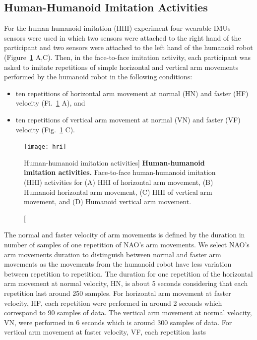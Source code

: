 \subsection{Human-Humanoid Imitation Activities} \label{sec:experiment:hhi}
For the human-humanoid imitation (HHI) experiment four wearable IMUs sensors 
were used in which two sensors were attached to the right hand of 
the participant and two sensors were attached to the left hand of 
the humanoid robot (Figure~\ref{fig:hri} A,C).
Then, in the face-to-face imitation activity, each participant was asked 
to imitate repetitions of simple horizontal and vertical arm movements 
performed by the humanoid robot in the following conditions:
\begin{itemize}[noitemsep,topsep=0pt]
\item ten repetitions of horizontal arm movement at normal (HN) and faster (HF) 
velocity (Fi.~\ref{fig:hri} A), and
\item ten repetitions of vertical arm movement at normal (VN) and faster (VF) 
velocity (Fig.~\ref{fig:hri} C).
\end{itemize}
\begin{figure}
  \centering
  \texttt{[image: hri]}
    \caption
	[Human-humanoid imitation activities]{
	{\bf Human-humanoid imitation activities.} 
		Face-to-face human-humanoid imitation (HHI) activities for 
		(A) HHI of horizontal arm movement, 
		(B) Humanoid horizontal arm movement,
		(C) HHI of vertical arm movement, and 
		(D) Humanoid vertical arm movement.
        }
    \label{fig:hri}
\end{figure}
The normal and faster velocity of arm movements is defined by the duration in 
number of samples of one repetition of NAO's arm movements.
We select NAO's arm movements duration to distinguish between normal and 
faster arm movements as the movements from the humanoid robot have less 
variation between repetition to repetition. 
The duration for one repetition of the horizontal 
arm movement at normal velocity, HN, is about 5 seconds considering that 
each repetition last around 250 samples. For horizontal arm movement at 
faster velocity, HF, each repetition were performed in around 2 seconds 
which correspond to 90 samples of data. 
The vertical arm movement at normal velocity, VN, were performed  in 6 seconds 
which is around 300 samples of data.
For vertical arm movement at faster velocity, VF, each repetition lasts 
